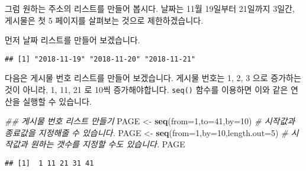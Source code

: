 \documentclass[]{article}
\newenvironment{Shaded}{\begin{snugshade}}{\end{snugshade}}
\newcommand{\CommentTok}[1]{\textcolor[rgb]{0.56,0.35,0.01}{\textit{#1}}}
\newcommand{\DataTypeTok}[1]{\textcolor[rgb]{0.13,0.29,0.53}{#1}}
\newcommand{\DecValTok}[1]{\textcolor[rgb]{0.00,0.00,0.81}{#1}}
\newcommand{\KeywordTok}[1]{\textcolor[rgb]{0.13,0.29,0.53}{\textbf{#1}}}
\newcommand{\NormalTok}[1]{#1}
\newcommand{\OperatorTok}[1]{\textcolor[rgb]{0.81,0.36,0.00}{\textbf{#1}}}
\newcommand{\StringTok}[1]{\textcolor[rgb]{0.31,0.60,0.02}{#1}}
\begin{document}
그럼 원하는 주소의 리스트를 만들어 봅시다. 날짜는 11월 19일부터 21일까지
3일간, 게시물은 첫 5 페이지를 살펴보는 것으로 제한하겠습니다.

먼저 날짜 리스트를 만들어 보겠습니다.

\begin{Shaded}
\end{Shaded}

\begin{verbatim}
## [1] "2018-11-19" "2018-11-20" "2018-11-21"
\end{verbatim}

다음은 게시물 번호 리스트를 만들어 보겠습니다. 게시물 번호는 1, 2, 3
으로 증가하는 것이 아니라, 1, 11, 21 로 10씩 증가해야합니다.
\texttt{seq()} 함수를 이용하면 이와 같은 연산을 실행할 수 있습니다.

\begin{Shaded}
\begin{Highlighting}[]
\CommentTok{## 게시물 번호 리스트 만들기}
\NormalTok{PAGE <-}\StringTok{ }\KeywordTok{seq}\NormalTok{(}\DataTypeTok{from=}\DecValTok{1}\NormalTok{,}\DataTypeTok{to=}\DecValTok{41}\NormalTok{,}\DataTypeTok{by=}\DecValTok{10}\NormalTok{) }\CommentTok{# 시작값과 종료값을 지정해줄 수 있습니다.}
\NormalTok{PAGE <-}\StringTok{ }\KeywordTok{seq}\NormalTok{(}\DataTypeTok{from=}\DecValTok{1}\NormalTok{,}\DataTypeTok{by=}\DecValTok{10}\NormalTok{,}\DataTypeTok{length.out=}\DecValTok{5}\NormalTok{) }\CommentTok{# 시작값과 원하는 갯수를 지정할 수도 있습니다.}
\NormalTok{PAGE}
\end{Highlighting}
\end{Shaded}

\begin{verbatim}
## [1]  1 11 21 31 41
\end{verbatim}
\end{document}
